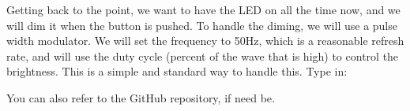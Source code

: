 Getting back to the point, we want to have the LED on all the time now, and we will dim it when the button is pushed.  To handle the diming, we will use a pulse width modulator.  We will set the frequency to 50Hz, which is a reasonable refresh rate, and will use the duty cycle (percent of the wave that is high) to control the brightness.  This is a simple and standard way to handle this.  Type in:


You can also refer to the GitHub repository, if need be.



